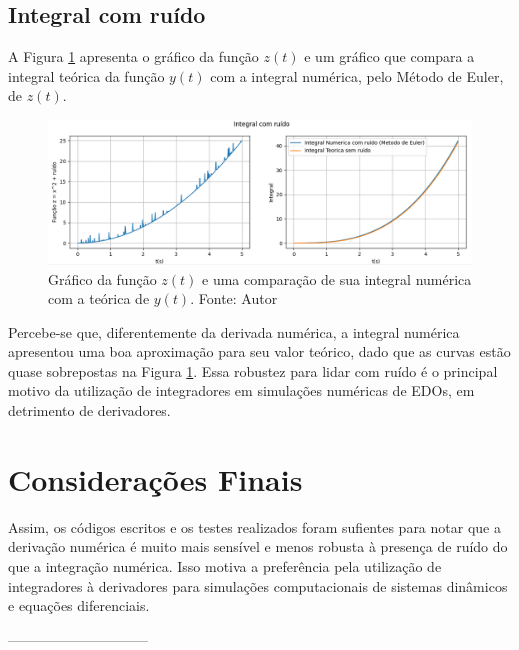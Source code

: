 \documentclass[
	12pt,				%
	openany,			%
	twoside,			%
	a4paper,			%
	english,			%
	french,				%
	spanish,			%
	brazil,				%
	]{abntex2}
\begin{document}
\section{Integral com ruído}
A Figura \ref{fig:zi} apresenta o gráfico da função $z(t)$ e um gráfico que compara a integral teórica da função $y(t)$ com a integral numérica, pelo Método de Euler, de $z(t)$.
\begin{figure}[H]
\center
    \includegraphics [scale = 0.5]{Figures/zi.png}
    \caption{Gráfico da função $z(t)$ e uma comparação de sua integral numérica com a teórica de $y(t)$. Fonte: Autor}
    \label{fig:zi}
\end{figure}
Percebe-se que, diferentemente da derivada numérica, a integral numérica apresentou uma boa aproximação para seu valor teórico, dado que as curvas estão quase sobrepostas na Figura \ref{fig:zi}. Essa robustez para lidar com ruído é o principal motivo da utilização de integradores em simulações numéricas de EDOs, em detrimento de derivadores.

\chapter{Considerações Finais}
Assim, os códigos escritos e os testes realizados foram sufientes para notar que a derivação numérica é muito mais sensível e menos robusta à presença de ruído do que a integração numérica. Isso motiva a preferência pela utilização de integradores à derivadores para simulações computacionais de sistemas dinâmicos e equações diferenciais.



\postextual

 
------------------------------




\printindex
\end{document}
